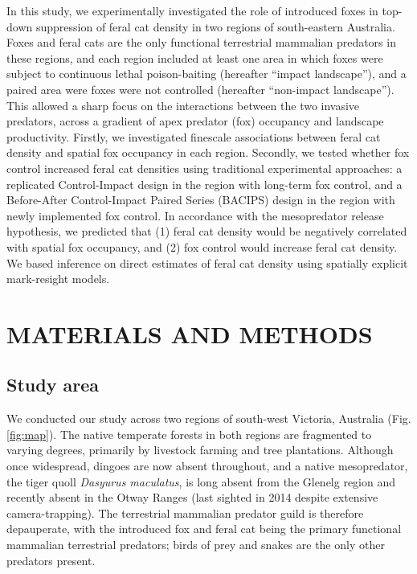 \documentclass[]{elsarticle} %
\begin{document}
In this study, we experimentally investigated the role of introduced foxes in top-down suppression of feral cat density in two regions of south-eastern Australia. Foxes and feral cats are the only functional terrestrial mammalian predators in these regions, and each region included at least one area in which foxes were subject to continuous lethal poison-baiting (hereafter ``impact landscape''), and a paired area were foxes were not controlled (hereafter ``non-impact landscape''). This allowed a sharp focus on the interactions between the two invasive predators, across a gradient of apex predator (fox) occupancy and landscape productivity. Firstly, we investigated finescale associations between feral cat density and spatial fox occupancy in each region. Secondly, we tested whether fox control increased feral cat densities using traditional experimental approaches: a replicated Control-Impact design in the region with long-term fox control, and a Before-After Control-Impact Paired Series (BACIPS) design in the region with newly implemented fox control. In accordance with the mesopredator release hypothesis, we predicted that (1) feral cat density would be negatively correlated with spatial fox occupancy, and (2) fox control would increase feral cat density.
We based inference on direct estimates of feral cat density using spatially explicit mark-resight models.

\newpage

\hypertarget{materials-and-methods}{%
\section{MATERIALS AND METHODS}\label{materials-and-methods}}

\hypertarget{study-area}{%
\subsection{Study area}\label{study-area}}

We conducted our study across two regions of south-west Victoria, Australia (Fig. \ref{fig:map}). The native temperate forests in both regions are fragmented to varying degrees, primarily by livestock farming and tree plantations. Although once widespread, dingoes are now absent throughout, and a native mesopredator, the tiger quoll \emph{Dasyurus maculatus}, is long absent from the Glenelg region and recently absent in the Otway Ranges (last sighted in 2014 despite extensive camera-trapping). The terrestrial mammalian predator guild is therefore depauperate, with the introduced fox and feral cat being the primary functional mammalian terrestrial predators; birds of prey and snakes are the only other predators present.
\end{document}
